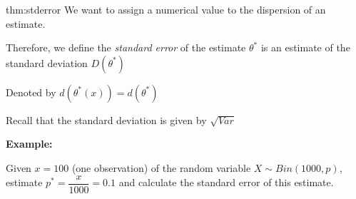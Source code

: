 \newpage
\begin{theo}{thm:stderror}
  We want to assign a numerical value to the dispersion of an estimate.\par
  \noindent Therefore, we define the \textit{standard error} of the estimate $\theta^*$ is an estimate of the standard deviation $D(\theta^*)$
  \par\bigskip
  \noindent Denoted by $d(\theta^*(x)) = d(\theta^*)$
  \par\bigskip
  \noindent Recall that the standard deviation is given by $\sqrt{Var}$
\end{theo}
\par\bigskip
\noindent\textbf{Example:}\par
\noindent Given $x=100$ (one observation) of the random variable $X\sim Bin(1000,p)$, estimate $p^* = \dfrac{x}{1000} = 0.1$ and calculate the standard error of this estimate.
